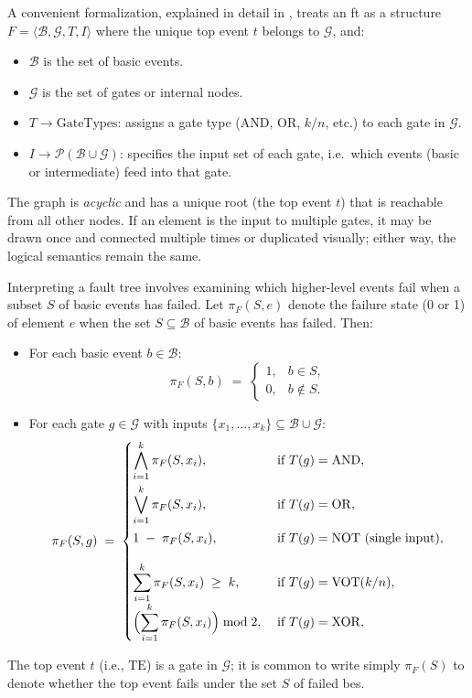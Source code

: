 A convenient formalization, explained in detail in \cite{ruijters_fault_2015}, treats an \acrshort{ft} as a structure \(F = \langle \mathcal{B}, \mathcal{G}, T, I \rangle\) where the unique top event \(t\) belongs to \(\mathcal{G}\), and:

\begin{itemize}
\item \(\mathcal{B}\) is the set of basic events. 
\item \(\mathcal{G}\) is the set of gates or internal nodes.
\item \(T \to \text{GateTypes}\): assigns a gate type (AND, OR, \(k/n\), etc.) to each gate in \(\mathcal{G}\).  
\item \(I \to \mathcal{P}(\mathcal{B} \cup \mathcal{G})\): specifies the input set of each gate, i.e.\ which events (basic or intermediate) feed into that gate.  
\end{itemize}

The graph is \emph{acyclic} and has a unique root (the top event \(t\)) that is reachable from all other nodes. If an element is the input to multiple gates, it may be drawn once and connected multiple times or duplicated visually; either way, the logical semantics remain the same.

Interpreting a fault tree involves examining which higher-level events fail when a subset $S$ of basic events has failed. Let $\pi_F(S, e)$ denote the failure state (0 or 1) of element $e$ when the set $S \subseteq \mathcal{B}$ of basic events has failed. Then:

\begin{itemize}
\item For each basic event \(b \in \mathcal{B}\):
  \[
    \pi_F(S, b) \;=\;
    \begin{cases}
      1, & b \in S,\\
      0, & b \notin S.
    \end{cases}
  \]
\item For each gate \(g \in \mathcal{G}\) with inputs \(\{x_1,\dots,x_k\}\subseteq \mathcal{B}\cup\mathcal{G}\):
  \[
  \pi_F(S,g) 
  \;=\;
  \begin{cases}
  \displaystyle
    \bigwedge_{i=1}^k \pi_F(S, x_i),
    & \;\text{if }T(g)=\mathrm{AND},\\[1.2em]
  \displaystyle
    \bigvee_{i=1}^k \pi_F(S, x_i),
    & \;\text{if }T(g)=\mathrm{OR},\\[1.2em]
  \displaystyle
    1 \;-\; \pi_F(S, x_i),
    & \;\text{if }T(g)=\mathrm{NOT} \text{ (single input)},\\[1.2em]
  \displaystyle
    \sum_{i=1}^k \pi_F(S,x_i)\;\ge\;k,
    & \;\text{if }T(g)=\mathrm{VOT}(k/n),\\
  \displaystyle
    \Bigl(\sum_{i=1}^k \pi_F(S,x_i)\Bigr)\bmod 2,
    & \;\text{if }T(g)=\mathrm{XOR} ,\\[0.6em]
  \end{cases}
  \]
\end{itemize}

The top event $t$ (i.e., $\mathrm{TE}$) is a gate in $\mathcal{G}$; it is common to write simply $\pi_F(S)$ to denote whether the top event fails under the set $S$ of failed \acrshort{be}s.